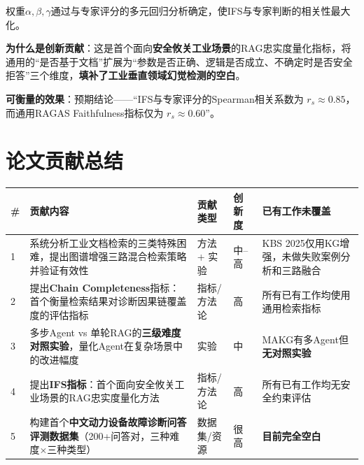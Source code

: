 \documentclass[a4paper, 11pt]{ctexart}
\begin{document}
\begin{tcolorbox}[colback=tsinghua!5, colframe=tsinghua!40, title=\textbf{原创指标：Industrial Faithfulness Score (IFS)}, fonttitle=\bfseries]
权重$\alpha, \beta, \gamma$通过与专家评分的多元回归分析确定，使IFS与专家判断的相关性最大化。

\textbf{为什么是创新贡献}：这是首个面向\textbf{安全攸关工业场景}的RAG忠实度量化指标，将通用的``是否基于文档''扩展为``参数是否正确、逻辑是否成立、不确定时是否安全拒答''三个维度，\textbf{填补了工业垂直领域幻觉检测的空白}。
\end{tcolorbox}

\textbf{可衡量的效果}：预期结论——``IFS与专家评分的Spearman相关系数为 $r_s \approx 0.85$，而通用RAGAS Faithfulness指标仅为 $r_s \approx 0.60$''。


\section{论文贡献总结}

\begin{table}[H]
\centering
\renewcommand{\arraystretch}{1.3}
\small
\begin{tabular}{p{0.5cm} p{4.5cm} p{2cm} p{1.5cm} p{4cm}}
    \toprule
    \textbf{\#} & \textbf{贡献内容} & \textbf{贡献类型} & \textbf{创新度} & \textbf{已有工作未覆盖} \\
    \midrule
    1 & 系统分析工业文档检索的三类特殊困难，提出图谱增强三路混合检索策略并验证有效性 & 方法 + 实验 & 中--高 & KBS 2025仅用KG增强，未做失败案例分析和三路融合 \\
    2 & 提出\textbf{Chain Completeness}指标：首个衡量检索结果对诊断因果链覆盖度的评估指标 & 指标/方法论 & 高 & 所有已有工作均使用通用检索指标 \\
    3 & 多步Agent vs 单轮RAG的\textbf{三级难度对照实验}，量化Agent在复杂场景中的改进幅度 & 实验 & 中 & MAKG有多Agent但\textbf{无对照实验} \\
    4 & 提出\textbf{IFS指标}：首个面向安全攸关工业场景的RAG忠实度量化方法 & 指标/方法论 & 高 & 所有已有工作均无安全约束评估 \\
    5 & 构建首个\textbf{中文动力设备故障诊断问答评测数据集}（200+问答对，三种难度$\times$三种类型） & 数据集/资源 & 很高 & \textbf{目前完全空白} \\
    \bottomrule
\end{tabular}
\end{table}
\end{document}
